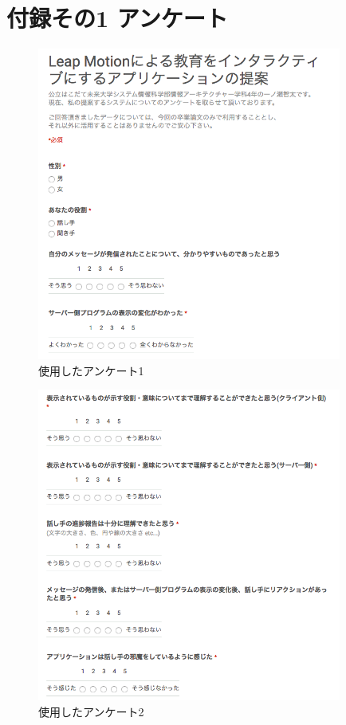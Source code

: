 \documentclass{funthesis}
\begin{document}
\appendix

\chapter*{付録その1 アンケート} %

 \begin{figure}[H]
 \begin{center}
  \includegraphics[width=100mm]{./img/ank1.png}
 \end{center}
 \caption{使用したアンケート1}
 \label{leap}
\end{figure}

 \begin{figure}[H]
 \begin{center}
  \includegraphics[width=100mm]{./img/ank2.png}
 \end{center}
 \caption{使用したアンケート2}
 \label{leap}
\end{figure}
\end{document}
